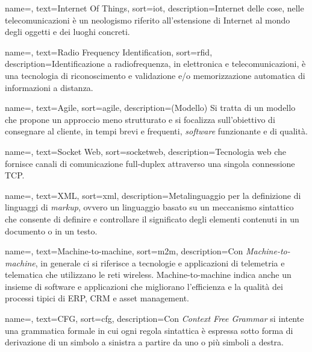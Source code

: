 {
    name=,
    text=Internet Of Things,
    sort=iot,
    description={Internet delle cose, nelle telecomunicazioni è un neologismo riferito all'estensione di Internet al mondo degli oggetti 
                e dei luoghi concreti.}
}

{
    name=,
    text=Radio Frequency Identification,
    sort=rfid,
    description={Identificazione a radiofrequenza, in elettronica e telecomunicazioni, è una tecnologia di riconoscimento e validazione e/o memorizzazione automatica di informazioni a distanza.}
}

{
    name=,
    text=Agile,
    sort=agile,
    description={(Modello) Si tratta di un modello che propone un approccio meno strutturato e si focalizza sull’obiettivo di consegnare al cliente, in tempi brevi e frequenti, \emph{software} funzionante e di qualità.}
}

{
    name=,
    text=Socket Web,
    sort=socketweb,
    description={Tecnologia web che fornisce canali di comunicazione full-duplex attraverso una singola connessione TCP.}
}

{
    name=,
    text=XML,
    sort=xml,
    description={Metalinguaggio per la definizione di linguaggi di \emph{markup}, ovvero un linguaggio basato su un meccanismo sintattico 
    che consente di definire e controllare il significato degli elementi contenuti in un documento o in un testo.}
}

{
    name=,
    text=Machine-to-machine,
    sort=m2m,
    description={Con \emph{Machine-to-machine}, in generale ci si riferisce a tecnologie e applicazioni di telemetria e telematica che utilizzano le 
                reti wireless. Machine-to-machine indica anche un insieme di software e applicazioni che migliorano l'efficienza e la qualità dei 
                processi tipici di ERP, CRM e asset management.}
}

{
    name=,
    text=CFG,
    sort=cfg,
    description={Con \emph{Context Free Grammar} si intente una grammatica formale in cui ogni regola sintattica è espressa sotto forma di derivazione 
                di un simbolo a sinistra a partire da uno o più simboli a destra.}
}